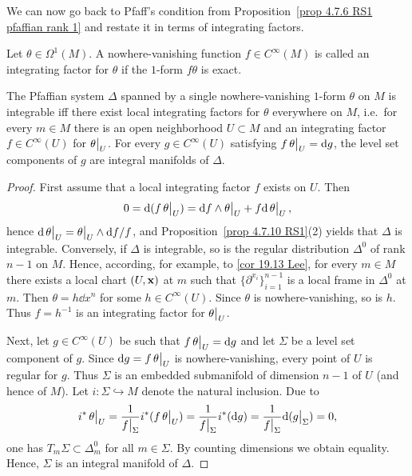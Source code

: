We can now go back to Pfaff's condition from Proposition~\ref{prop 4.7.6 RS1 pfaffian rank 1} and restate it in terms of integrating factors.

\begin{defn}
    Let $\theta\in\Omega^1(M)$. A nowhere-vanishing function $f\in C^\infty(M)$ is called an integrating factor for $\theta$ if the $1$-form $f\theta$ is exact.
\end{defn}

\begin{prop}[{{\cite[Prop.~4.7.13]{RS1}}}]\label{prop 4.7.13 RS1}
    The Pfaffian system $\Delta$ spanned by a single nowhere-vanishing $1$-form $\theta$ on $M$ is integrable iff there exist local integrating factors for $\theta$ everywhere on $M$, i.e.~for every $m\in M$ there is an open neighborhood $U\subset M$ and an integrating factor $f\in C^\infty(U)$ for $\restr{\theta}{U}$. For every $g\in C^\infty(U)$ satisfying $f\restr{\theta}{U}=\dd g$, the level set components of $g$ are integral manifolds of $\Delta$.
\end{prop}
\begin{proof}
    First assume that a local integrating factor $f$ exists on $U$. Then 
    \[0=\dd(f\restr{\theta}{U})=\dd f\wedge\restr{\theta}{U}+f\dd\restr{\theta}{U},\]
    hence $\dd\restr{\theta}{U}=\restr{\theta}{U}\wedge \dd f/f$, and Proposition~\ref{prop 4.7.10 RS1}(2) yields that $\Delta$ is integrable. Conversely, if $\Delta$ is integrable, so is the regular distribution $\Delta^0$ of rank $n-1$ on $M$. Hence, according, for example, to \ref{cor 19.13 Lee}, for every $m\in M$ there exists a local chart $(U,\bf{x})$ at $m$ such that $\{\partial^{x_i}\}_{i=1}^{n-1}$ is a local frame in $\Delta^0$ at $m$. Then $\theta=h\dd x^n$ for some $h\in C^\infty(U)$. Since $\theta$ is nowhere-vanishing, so is $h$. Thus $f=h^{-1}$ is an integrating factor for $\restr{\theta}{U}$.

    Next, let $g\in C^\infty(U)$ be such that $f\restr{\theta}{U}=\dd g$ and let $\Sigma$ be a level set component of $g$. Since $\dd g=f\restr{\theta}{U}$ is nowhere-vanishing, every point of $U$ is regular for $g$. Thus $\Sigma$ is an embedded submanifold of dimension $n-1$ of $U$ (and hence of $M$). Let $i:\Sigma\hookrightarrow M$ denote the natural inclusion. Due to
    \[i^\ast\restr{\theta}{U}=\frac{1}{\restr{f}{\Sigma}}i^\ast(f\restr{\theta}{U})=\frac{1}{\restr{f}{\Sigma}}i^\ast(\dd g)=\frac{1}{\restr{f}{\Sigma}}\dd(\restr{g}{\Sigma})=0, \]
    one has $T_m\Sigma\subset\Delta_m^0$ for all $m\in\Sigma$. By counting dimensions we obtain equality. Hence, $\Sigma$ is an integral manifold of $\Delta$.
\end{proof}


